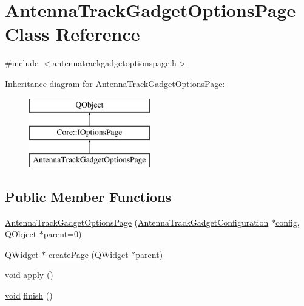 \hypertarget{class_antenna_track_gadget_options_page}{\section{Antenna\-Track\-Gadget\-Options\-Page Class Reference}
\label{class_antenna_track_gadget_options_page}
}


{\ttfamily \#include $<$antennatrackgadgetoptionspage.\-h$>$}

Inheritance diagram for Antenna\-Track\-Gadget\-Options\-Page\-:\begin{figure}[H]
\begin{center}
\leavevmode
\includegraphics[height=3.000000cm]{class_antenna_track_gadget_options_page}
\end{center}
\end{figure}
\subsection*{Public Member Functions}
\begin{DoxyCompactItemize}
\item 
\hyperlink{group___antenna_track_gadget_plugin_gaf422edb8885c7e52f91e53e8671ca7e7}{Antenna\-Track\-Gadget\-Options\-Page} (\hyperlink{class_antenna_track_gadget_configuration}{Antenna\-Track\-Gadget\-Configuration} $\ast$\hyperlink{deflate_8c_a4473b5227787415097004fd39f55185e}{config}, Q\-Object $\ast$parent=0)
\item 
Q\-Widget $\ast$ \hyperlink{group___antenna_track_gadget_plugin_gab61c88a985c6dddb814fbd1dbb7a6455}{create\-Page} (Q\-Widget $\ast$parent)
\item 
\hyperlink{group___u_a_v_objects_plugin_ga444cf2ff3f0ecbe028adce838d373f5c}{void} \hyperlink{group___antenna_track_gadget_plugin_gae05ea679125a443f47b6835fb243c3fb}{apply} ()
\item 
\hyperlink{group___u_a_v_objects_plugin_ga444cf2ff3f0ecbe028adce838d373f5c}{void} \hyperlink{group___antenna_track_gadget_plugin_ga21f19cc8645a21200da9d3489a2a4bdf}{finish} ()
\end{DoxyCompactItemize}


